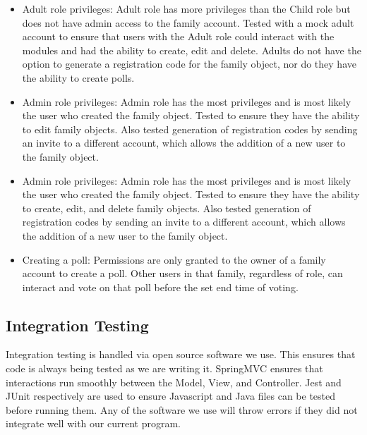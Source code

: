 \documentclass[12pt]{article}
\begin{document}
\begin{itemize}
    \item Adult role privileges: Adult role has more privileges than the Child role but does not have admin access to the family account. Tested with a mock adult account to ensure that users with the Adult role could interact with the modules and had the ability to create, edit and delete. Adults do not have the option to generate a registration code for the family object, nor do they have the ability to create polls.  
    \item Admin role privileges: Admin role has the most privileges and is most likely the user who created the family object. Tested to ensure they have the ability to edit family objects. Also tested generation of registration codes by sending an invite to a different account, which allows the addition of a new user to the family object. 
    \item Admin role privileges: Admin role has the most privileges and is most likely the user who created the family object. Tested to ensure they have the ability to create, edit, and delete family objects. Also tested generation of registration codes by sending an invite to a different account, which allows the addition of a new user to the family object.
    \item Creating a poll: Permissions are only granted to the owner of a family account to create a poll. Other users in that family, regardless of role, can interact and vote on that poll before the set end time of voting. 
\end{itemize}


\subsection{Integration Testing}
Integration testing is handled via open source software we use. This ensures that code is always being tested as we are writing it. SpringMVC ensures that interactions run smoothly between the Model, View, and Controller. Jest and JUnit respectively are used to ensure Javascript and Java files can be tested before running them. Any of the software we use will throw errors if they did not integrate well with our current program. 
\end{document}
